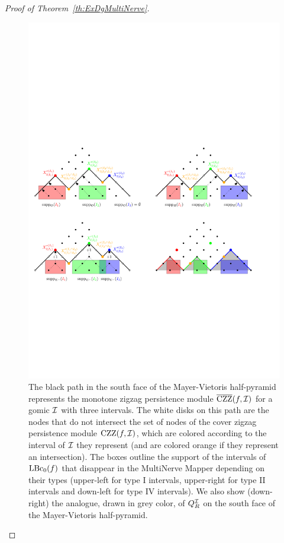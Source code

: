 \begin{proof}[Proof of Theorem~\ref{th:ExDgMultiNerve}]
\begin{figure}[h]\centering
\includegraphics[width=15cm]{figures/ZZProjections}
\caption[Zigzag persistence modules in the half-pyramid]{\label{fig:suppZZ} The black path in the south face of the
  Mayer-Vietoris half-pyramid represents the monotone zigzag persistence module
  $\overline{\rm CZZ}(f,\mathcal I)$ for a gomic $\mathcal{I}$ with three intervals. The
  white disks on this path are the nodes that do not intersect the set
  of nodes of the cover zigzag persistence module $\mathrm{CZZ}(f,\mathcal{I})$, which are colored
  according to the interval of $\mathcal{I}$ they represent (and are colored
  orange if they represent an intersection). The boxes outline the
  support of the intervals of $\mathrm{LBc}_0(f)$ that disappear in the
  MultiNerve Mapper depending on their types (upper-left for
  type I intervals, upper-right for type II intervals and
  down-left for type IV intervals). We also show (down-right) the
  analogue, drawn in grey color, of $Q^{\mathcal{I}}_R$ on the south face of the
  Mayer-Vietoris half-pyramid.}
\end{figure}


\end{proof}
